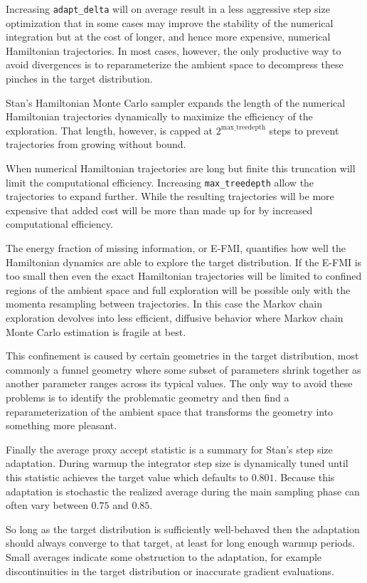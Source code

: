 \documentclass[
  letterpaper,
  DIV=11,
  numbers=noendperiod]{scrartcl}
\begin{document}
Increasing \texttt{adapt\_delta} will on average result in a less
aggressive step size optimization that in some cases may improve the
stability of the numerical integration but at the cost of longer, and
hence more expensive, numerical Hamiltonian trajectories. In most cases,
however, the only productive way to avoid divergences is to
reparameterize the ambient space to decompress these pinches in the
target distribution.

Stan's Hamiltonian Monte Carlo sampler expands the length of the
numerical Hamiltonian trajectories dynamically to maximize the
efficiency of the exploration. That length, however, is capped at
\(2^{\text{max\_treedepth}}\) steps to prevent trajectories from growing
without bound.

When numerical Hamiltonian trajectories are long but finite this
truncation will limit the computational efficiency. Increasing
\texttt{max\_treedepth} allow the trajectories to expand further. While
the resulting trajectories will be more expensive that added cost will
be more than made up for by increased computational efficiency.

The energy fraction of missing information, or E-FMI, quantifies how
well the Hamiltonian dynamics are able to explore the target
distribution. If the E-FMI is too small then even the exact Hamiltonian
trajectories will be limited to confined regions of the ambient space
and full exploration will be possible only with the momenta resampling
between trajectories. In this case the Markov chain exploration devolves
into less efficient, diffusive behavior where Markov chain Monte Carlo
estimation is fragile at best.

This confinement is caused by certain geometries in the target
distribution, most commonly a funnel geometry where some subset of
parameters shrink together as another parameter ranges across its
typical values. The only way to avoid these problems is to identify the
problematic geometry and then find a reparameterization of the ambient
space that transforms the geometry into something more pleasant.

Finally the average proxy accept statistic is a summary for Stan's step
size adaptation. During warmup the integrator step size is dynamically
tuned until this statistic achieves the target value which defaults to
\(0.801\). Because this adaptation is stochastic the realized average
during the main sampling phase can often vary between \(0.75\) and
\(0.85\).

So long as the target distribution is sufficiently well-behaved then the
adaptation should always converge to that target, at least for long
enough warmup periods. Small averages indicate some obstruction to the
adaptation, for example discontinuities in the target distribution or
inaccurate gradient evaluations.
\end{document}
